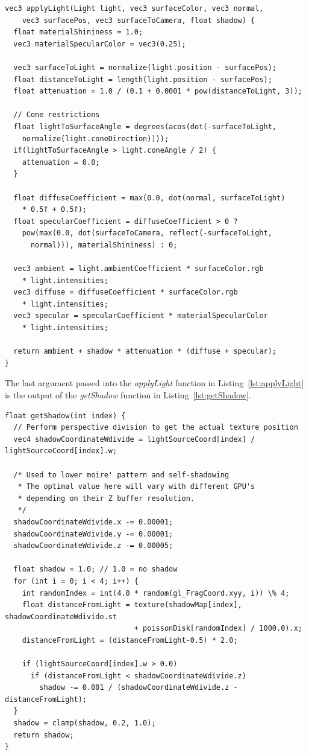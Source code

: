 \documentclass[a4paper,12pt]{article}
\begin{document}
\begin{lstlisting}[label=lst:applyLight,caption= Shader function for applying lighting]
vec3 applyLight(Light light, vec3 surfaceColor, vec3 normal,
    vec3 surfacePos, vec3 surfaceToCamera, float shadow) {
  float materialShininess = 1.0;
  vec3 materialSpecularColor = vec3(0.25);

  vec3 surfaceToLight = normalize(light.position - surfacePos);
  float distanceToLight = length(light.position - surfacePos);
  float attenuation = 1.0 / (0.1 + 0.0001 * pow(distanceToLight, 3));

  // Cone restrictions
  float lightToSurfaceAngle = degrees(acos(dot(-surfaceToLight,
    normalize(light.coneDirection))));
  if(lightToSurfaceAngle > light.coneAngle / 2) {
    attenuation = 0.0;
  }

  float diffuseCoefficient = max(0.0, dot(normal, surfaceToLight)
    * 0.5f + 0.5f);
  float specularCoefficient = diffuseCoefficient > 0 ?
    pow(max(0.0, dot(surfaceToCamera, reflect(-surfaceToLight,
      normal))), materialShininess) : 0;

  vec3 ambient = light.ambientCoefficient * surfaceColor.rgb
    * light.intensities;
  vec3 diffuse = diffuseCoefficient * surfaceColor.rgb
    * light.intensities;
  vec3 specular = specularCoefficient * materialSpecularColor
    * light.intensities;

  return ambient + shadow * attenuation * (diffuse + specular);
}
\end{lstlisting}

The last argument passed into the \emph{applyLight} function in Listing~\ref{lst:applyLight} is the output of the \emph{getShadow} function in Listing~\ref{lst:getShadow}.

\begin{lstlisting}[label=lst:getShadow,caption= The shader function figuring out whether the fragment is in the shade.]
float getShadow(int index) {
  // Perform perspective division to get the actual texture position
  vec4 shadowCoordinateWdivide = lightSourceCoord[index] / lightSourceCoord[index].w;

  /* Used to lower moire' pattern and self-shadowing
   * The optimal value here will vary with different GPU's
   * depending on their Z buffer resolution.
   */
  shadowCoordinateWdivide.x -= 0.00001;
  shadowCoordinateWdivide.y -= 0.00001;
  shadowCoordinateWdivide.z -= 0.00005;

  float shadow = 1.0; // 1.0 = no shadow
  for (int i = 0; i < 4; i++) {
    int randomIndex = int(4.0 * random(gl_FragCoord.xyy, i)) \% 4;
    float distanceFromLight = texture(shadowMap[index], shadowCoordinateWdivide.st
                              + poissonDisk[randomIndex] / 1000.0).x;
    distanceFromLight = (distanceFromLight-0.5) * 2.0;

    if (lightSourceCoord[index].w > 0.0)
      if (distanceFromLight < shadowCoordinateWdivide.z)
        shadow -= 0.001 / (shadowCoordinateWdivide.z - distanceFromLight);
  }
  shadow = clamp(shadow, 0.2, 1.0);
  return shadow;
}
\end{lstlisting}
\end{document}
